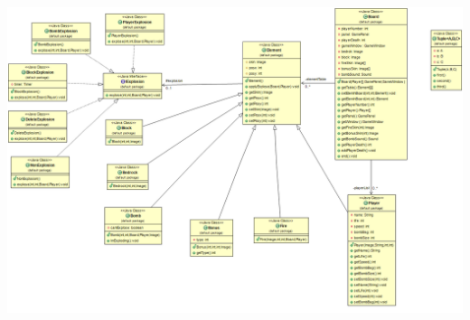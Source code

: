         \begin{center}
        \centering
		\includegraphics[scale=0.44]{ch1/newModel}
 	 	\label{fig:DiagModel}
        \end{center}
        
        
        
        
        
        
        
        
        
        
        
        
        
        
        
        
        
        
        
        
        
        
        
        
        
        
        
        
        
        
		
	


